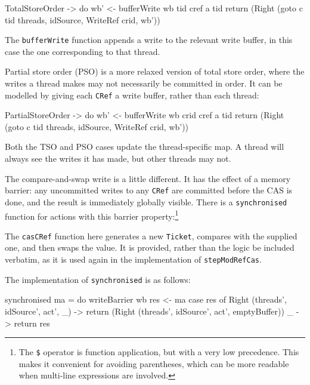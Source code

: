 \begin{haskellcode}
  TotalStoreOrder -> do
    wb' <- bufferWrite wb tid cref a tid
    return (Right (goto c tid threads, idSource, WriteRef crid, wb'))
\end{haskellcode}

The \verb|bufferWrite| function appends a write to the relevant write
buffer, in this case the one corresponding to that thread.

Partial store order (PSO) is a more relaxed version of total store order,
where the writes a thread makes may not necessarily be committed in
order. It can be modelled by giving each \verb|CRef| a write buffer,
rather than each thread:

\begin{haskellcode}
  PartialStoreOrder -> do
    wb' <- bufferWrite wb crid cref a tid
    return (Right (goto c tid threads, idSource, WriteRef crid, wb'))
\end{haskellcode}

Both the TSO and PSO cases update the thread-specific map. A thread
will always see the writes it has made, but other threads may not.

The compare-and-swap write is a little different. It has the effect of
a memory barrier: any uncommitted writes to any \verb|CRef| are
committed before the CAS is done, and the result is immediately
globally visible. There is a \verb|synchronised| function for actions
with this barrier property:\footnote{The \texttt{\$} operator is
  function application, but with a very low precedence. This makes it
  convenient for avoiding parentheses, which can be more readable when
  multi-line expressions are involved.}


The \verb|casCRef| function here generates a new \verb|Ticket|,
compares with the supplied one, and then swaps the value. It is
provided, rather than the logic be included verbatim, as it is used
again in the implementation of \verb|stepModRefCas|.

The implementation of \verb|synchronised| is as follows:

\begin{haskellcode}
synchronised ma = do
  writeBarrier wb
  res <- ma
  case res of
    Right (threads', idSource', act', _) -> return
      (Right (threads', idSource', act', emptyBuffer))
    _ -> return res
\end{haskellcode}

